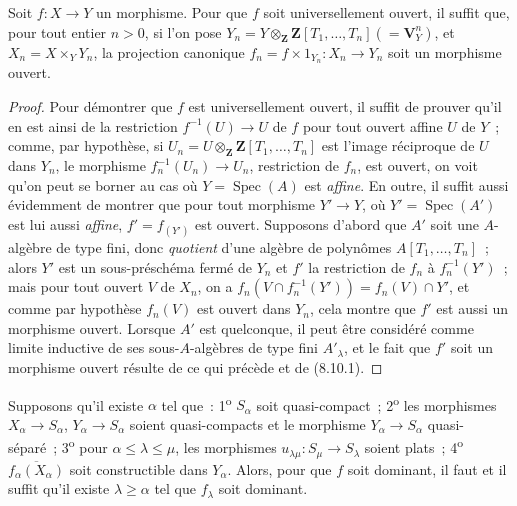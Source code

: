 \begin{corollary}[8.10.2]
\label{IV.8.10.2-fr}
Soit $f:X\to Y$ un morphisme. Pour que $f$ soit universellement ouvert, il
suffit que, pour tout entier $n>0$, si l'on pose
$Y_n=Y\otimes_{\mathbf Z}\mathbf Z[T_1,\ldots,T_n](=\mathbf V_Y^n)$, et
$X_n=X\times_YY_n$, la projection canonique
$f_n=f\times1_{Y_n}:X_n\to Y_n$ soit un morphisme ouvert.
\end{corollary}

\begin{proof}
Pour démontrer que $f$ est universellement ouvert, il suffit de prouver qu'il
en est ainsi de la restriction $f^{-1}(U)\to U$ de $f$ pour tout ouvert affine
$U$ de $Y$~; comme, par hypothèse, si
$U_n=U\otimes_{\mathbf Z}\mathbf Z[T_1,\ldots,T_n]$ est l'image réciproque de
$U$ dans $Y_n$, le morphisme $f_n^{-1}(U_n)\to U_n$, restriction de $f_n$, est
ouvert, on voit qu'on peut se borner au cas où $Y=\operatorname{Spec}(A)$ est
\emph{affine}. En outre, il suffit aussi évidemment de montrer que pour tout
morphisme $Y'\to Y$, où $Y'=\operatorname{Spec}(A')$ est lui aussi \emph{affine},
$f'=f_{(Y')}$ est ouvert. Supposons d'abord que $A'$ soit une $A$-algèbre de
type fini, donc \emph{quotient} d'une algèbre de polynômes $A[T_1,\ldots,T_n]$~;
alors $Y'$ est un sous-préschéma fermé de $Y_n$ et $f'$ la
restriction de $f_n$ à $f_n^{-1}(Y')$~; mais pour tout ouvert $V$ de $X_n$,
on a $f_n(V\cap f_n^{-1}(Y'))=f_n(V)\cap Y'$, et comme par hypothèse $f_n(V)$
est ouvert dans $Y_n$, cela montre que $f'$ est aussi un morphisme ouvert.
Lorsque $A'$ est quelconque, il peut être considéré comme limite inductive de
ses sous-$A$-algèbres de type fini $A'_\lambda$, et le fait que $f'$ soit un
morphisme ouvert résulte de ce qui précède et de (8.10.1).
\end{proof}

\begin{proposition}[8.10.3]
Supposons qu'il existe $\alpha$ tel que~: 1\textsuperscript{o} $S_\alpha$ soit
quasi-compact~; 2\textsuperscript{o} les morphismes $X_\alpha\to S_\alpha$,
$Y_\alpha\to S_\alpha$ soient quasi-compacts et le morphisme
$Y_\alpha\to S_\alpha$ quasi-séparé~; 3\textsuperscript{o} pour
$\alpha\leq\lambda\leq\mu$, les morphismes
$u_{\lambda\mu}:S_\mu\to S_\lambda$ soient \textup{plats}~; 4\textsuperscript{o}
$\overline{f_\alpha(X_\alpha)}$ soit constructible dans $Y_\alpha$. Alors,
pour que $f$ soit dominant, il faut et il suffit qu'il existe
$\lambda\geq\alpha$ tel que $f_\lambda$ soit dominant.
\end{proposition}

